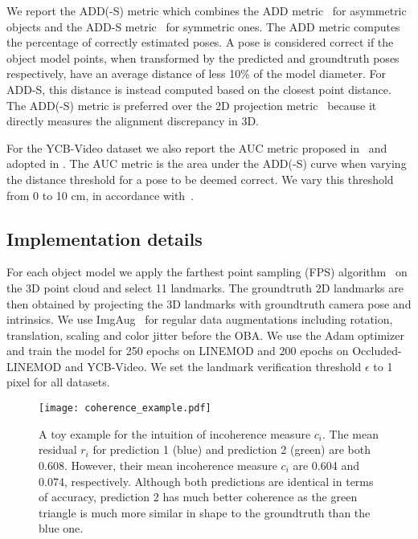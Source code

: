 \documentclass[10pt,twocolumn,letterpaper]{article}
\begin{document}
We report the ADD(-S) metric which combines the ADD metric~\cite{Hinterstoisser2012model} for asymmetric objects and the ADD-S metric~\cite{Xiang2018posecnn} for symmetric ones. The ADD metric computes the percentage of correctly estimated poses. A pose is considered correct if the object model points, when transformed by the predicted and groundtruth poses respectively, have an average distance of less 10\% of the model diameter. For ADD-S, this distance is instead computed based on the closest point distance. The ADD(-S) metric is preferred over the 2D projection metric~\cite{brachmann2016Uncertainty} because it directly measures the alignment discrepancy in 3D. 

For the YCB-Video dataset we also report the AUC metric proposed in~\cite{Xiang2018posecnn} and adopted in \cite{Oberweger2018making, Peng2019pvnet}. The AUC metric is the area under the ADD(-S) curve when varying the distance threshold for a pose to be deemed correct. We vary this threshold from 0 to 10 cm, in accordance with~\cite{Xiang2018posecnn}. 



\subsection{Implementation details}
For each object model we apply the farthest point sampling (FPS) algorithm~\cite{Peng2019pvnet} on the 3D point cloud and select 11 landmarks. The groundtruth 2D landmarks are then obtained by projecting the 3D landmarks with groundtruth camera pose and intrinsics. 
We use ImgAug~\cite{imgaug} for regular data augmentations including rotation, translation, scaling and color jitter before the OBA. We use the Adam optimizer~\cite{Kingma2015adam} and train the model for 250 epochs on LINEMOD and 200 epochs on Occluded-LINEMOD and YCB-Video. We set the landmark verification threshold $\epsilon$ to 1 pixel for all datasets.


\begin{figure}[t]
    \centering
    \texttt{[image: coherence\_example.pdf]}
    \caption{A toy example for the intuition of incoherence measure $c_i$. The mean residual $r_i$ for prediction 1 (blue) and prediction 2 (green) are both 0.608. However, their mean incoherence measure $c_i$ are 0.604 and 0.074, respectively. Although both predictions are identical in terms of accuracy, prediction 2 has much better coherence as the green triangle is much more similar in shape to the groundtruth than the blue one.}
    \label{fig:cohere}
\end{figure}
\end{document}
